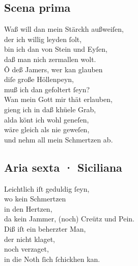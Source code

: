 \documentclass{ees}
\newenvironment{lyrics}[1]{%
  \subsection{#1}\nopagebreak%
  \begin{lyricslist}%
  \let\voice\item%
}{%
  \end{lyricslist}%
}
\begin{document}
\begin{lyrics}{Scena prima}
  \voice[Job]
  Waß will dan mein Stärckh außweiſen,\\
  der ich willig leyden ſolt,\\
  bin ich dan von Stein und Eyſen,\\
  daß man nich zermallen wolt.\\
  Ô deß Jamers, wer kan glauben\\
  diſe große Höllenpeyn,\\
  muß ich dan gefoltert ſeyn?\\
  Wan mein Gott mir thät erlauben,\\
  gieng ich in daß khüele Grab,\\
  alda könt ich wohl geneſen,\\
  wäre gleich als nie geweſen,\\
  und nehm all mein Schmertzen ab.
\end{lyrics}

\begin{lyrics}{Aria sexta · Siciliana}
  \voice[Job]
  Leichtlich iſt geduldig ſeyn,\\
  wo kein Schmertzen\\
  in den Hertzen,\\
  da kein Jammer, (noch) Creütz und Pein.\\[1ex]
  Diß iſt ein beherzter Man,\\
  der nicht klaget,\\
  noch verzaget,\\
  in die Noth ſich ſchickhen kan.
\end{lyrics}
\end{document}
